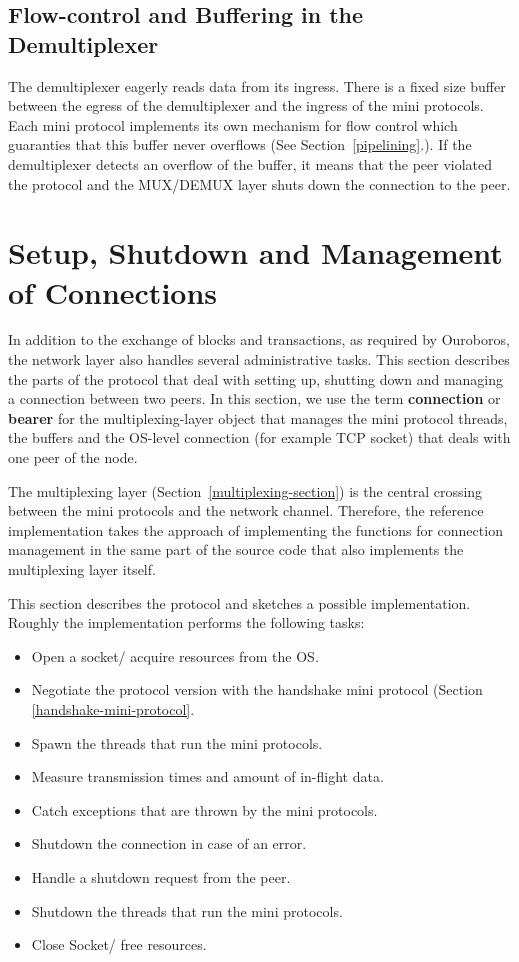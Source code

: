 \documentclass{report}
\newcommand{\hide}[1]{}
\newcommand{\hide}[1]{}
\theoremstyle{definition}{
  \newtheorem{lemma}{Lemma}[section] %
  \newtheorem{definition}[lemma]{Definition}
}
\theoremstyle{theorem}{
  \newtheorem{invariant}[lemma]{Invariant}
  \newtheorem{proofobligation}[lemma]{Proof Obligation}
}
\numberwithin{equation}{lemma}
\begin{document}
\subsection{Flow-control and Buffering in the Demultiplexer}
\label{mux-flow-control}
The demultiplexer eagerly reads data from its ingress.
There is a fixed size buffer between the egress of the demultiplexer and the ingress of
the mini protocols.
Each mini protocol implements its own mechanism for flow control which guaranties that this buffer
never overflows (See Section~\ref{pipelining}.).
If the demultiplexer detects an overflow of the buffer, it means that the peer violated the
protocol and the MUX/DEMUX layer shuts down the connection to the peer.

\hide{
The size of the buffers is listed in Table~\ref{demux-buffers}.
}

\section{Setup, Shutdown and Management of Connections}
\label{peer-setup-section}
In addition to the exchange of blocks and transactions, as required by Ouroboros,
the network layer also handles several administrative tasks.
This section describes the parts of the protocol that deal with setting up, shutting down and
managing a connection between two peers.
In this section, we use the term {\bf connection} or {\bf bearer} for the multiplexing-layer object
that manages the mini protocol threads, the buffers and the OS-level connection
(for example TCP socket) that deals with one peer of the node.

The multiplexing layer (Section~\ref{multiplexing-section}) is the central crossing between
the mini protocols and the network channel.
Therefore, the reference implementation takes the approach
of implementing the functions for connection management in the same part of the source code
that also implements the multiplexing layer itself.

This section describes the protocol and sketches a possible implementation.
Roughly the implementation performs the following tasks:
\begin{itemize}
\item Open a socket/ acquire resources from the OS.
\item Negotiate the protocol version with the handshake mini protocol
      (Section \ref{handshake-mini-protocol}.
\item Spawn the threads that run the mini protocols.
\item Measure transmission times and amount of in-flight data.
\item Catch exceptions that are thrown by the mini protocols.
\item Shutdown the connection in case of an error.
\item Handle a shutdown request from the peer.
\item Shutdown the threads that run the mini protocols.
\item Close Socket/ free resources.
\end{itemize}
\end{document}
